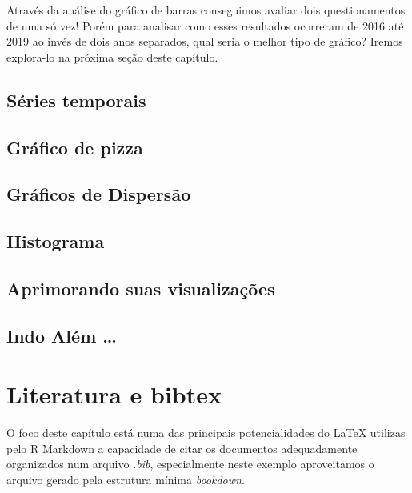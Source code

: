 \documentclass[
]{book}
\begin{document}
Através da análise do gráfico de barras conseguimos avaliar dois questionamentos de uma só vez! Porém para analisar como esses resultados ocorreram de 2016 até 2019 ao invés de dois anos separados, qual seria o melhor tipo de gráfico? Iremos explora-lo na próxima seção deste capítulo.

\hypertarget{suxe9ries-temporais}{%
\section{Séries temporais}\label{suxe9ries-temporais}}

\hypertarget{gruxe1fico-de-pizza}{%
\section{Gráfico de pizza}\label{gruxe1fico-de-pizza}}

\hypertarget{gruxe1ficos-de-dispersuxe3o}{%
\section{Gráficos de Dispersão}\label{gruxe1ficos-de-dispersuxe3o}}

\hypertarget{histograma}{%
\section{Histograma}\label{histograma}}

\hypertarget{aprimorando-suas-visualizauxe7uxf5es}{%
\section{Aprimorando suas visualizações}\label{aprimorando-suas-visualizauxe7uxf5es}}

\hypertarget{indo-aluxe9m}{%
\section{Indo Além \ldots{}}\label{indo-aluxe9m}}

\hypertarget{literatura-e-bibtex}{%
\chapter{Literatura e bibtex}\label{literatura-e-bibtex}}

O foco deste capítulo está numa das
principais potencialidades do LaTeX
utilizas pelo R Markdown a capacidade
de citar os documentos adequadamente
organizados num arquivo \emph{.bib},
especialmente neste exemplo aproveitamos
o arquivo gerado pela estrutura mínima
\emph{bookdown}.
\end{document}
